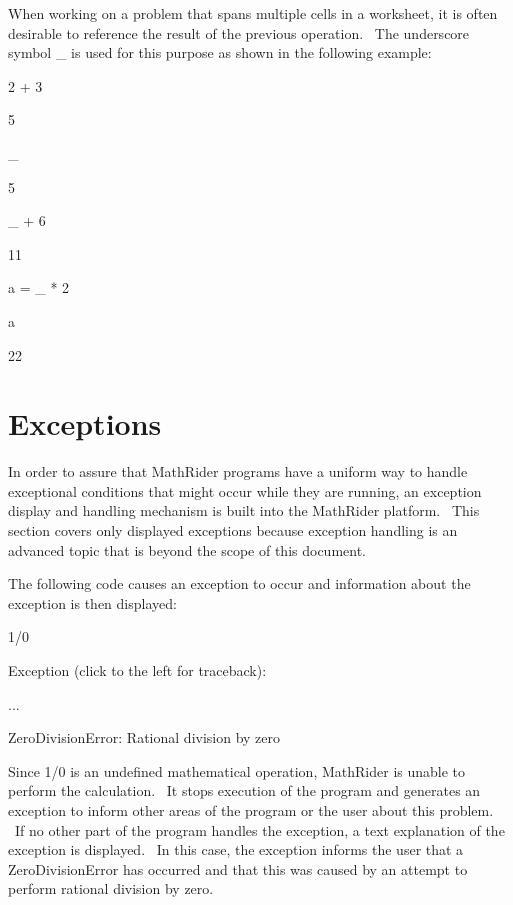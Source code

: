\documentclass[12pt,twoside]{book}
\begin{document}
When working on a problem that spans multiple cells in a worksheet, it is often desirable to reference the result of the previous operation. \ The underscore symbol {\textquotesingle}\_{\textquotesingle} is used for this purpose as shown in the following example: 

\bigskip

2 + 3

{\textbar}

5

\_

{\textbar}

5


\bigskip

\_ + 6

{\textbar}

11


\bigskip

a = \_ * 2

a

{\textbar}

22

\section[Exceptions]{Exceptions}

In order to assure that MathRider programs have a uniform way to handle exceptional conditions that might occur while they are running, an exception display and handling mechanism is built into the MathRider platform. \ This section covers only displayed exceptions because exception handling is an advanced topic that is beyond the scope of this document. 

\bigskip

The following code causes an exception to occur and information about the exception is then displayed: 

\bigskip

1/0

{\textbar}

Exception (click to the left for traceback):

...

ZeroDivisionError: Rational division by zero


\bigskip

Since 1/0 is an undefined mathematical operation, MathRider is unable to perform the calculation. \ It stops execution of the program and generates an exception to inform other areas of the program or the user about this problem. \ If no other part of the program handles the exception, a text explanation of the exception is displayed. \ In this case, the exception informs the user that a ZeroDivisionError has occurred and that this was caused by an attempt to perform {\textquotedbl}rational division by zero{\textquotedbl}. 
\end{document}
